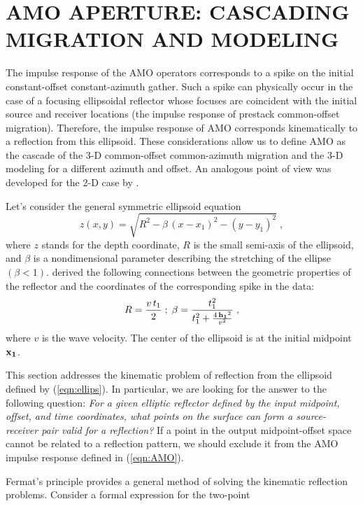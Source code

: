 \section{AMO APERTURE: CASCADING MIGRATION AND MODELING}
The impulse response of the AMO operators corresponds to a spike on
the initial constant-offset constant-azimuth gather. Such a spike
can physically occur in the case of a focusing ellipsoidal
reflector whose focuses are coincident with the initial source and
receiver locations (the impulse response of prestack common-offset
migration). Therefore, the impulse response of AMO corresponds 
kinematically to a reflection from this ellipsoid. These
considerations allow us to define AMO as the cascade of the 3-D
common-offset common-azimuth migration and the 3-D modeling for a different
azimuth and offset. An analogous point of
view was
developed for the 2-D case
by \cite{GPR29-03-03740406}.      
\par
Let's consider the general symmetric ellipsoid equation
\begin{equation}
z(x,y)=\sqrt{R^2-\beta\,\left(x-x_1\right)^2-\left(y-y_1\right)^2}\;,
\label{eqn:ellips}
\end{equation}
where $z$ stands for the depth coordinate, $R$ is the small semi-axis
of the ellipsoid, and $\beta$ is a nondimensional parameter describing
the stretching of the ellipse $(\beta < 1)$. \cite{GPR29-03-03740406}
derived the following connections between the geometric properties of
the reflector and the coordinates of the corresponding spike in the
data:
\begin{equation}
R={{v\,t_1}\over 2}\;;\;
\beta={t_1^2 \over t_1^2+{{4\,{\bf h_1}^2}\over v^2}}\;,
\label{eqn:rbeta}
\end{equation}
where $v$ is the wave velocity. 
The center of the ellipsoid is at the initial midpoint ${\bf x_1}$.
\par
This section addresses the kinematic problem of reflection
from the ellipsoid defined by (\ref{eqn:ellips}). In particular, we are looking for
the answer to the following question: {\em For a given elliptic
reflector defined by the input midpoint, offset, and time coordinates,
what points on the surface can form a source-receiver pair valid for a
reflection?} If a point in the output midpoint-offset space
cannot be related to a reflection pattern, we should exclude it from the AMO
impulse response defined in (\ref{eqn:AMO}).
\par 
Fermat's principle provides a general method of solving the kinematic reflection problems. Consider a formal expression for the two-point
